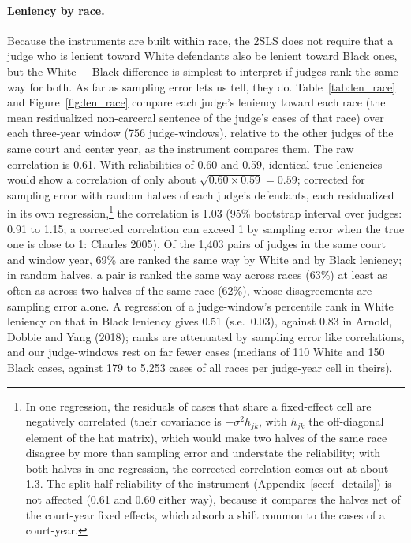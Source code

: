 \documentclass[11pt]{article}
\begin{document}
\paragraph{Leniency by race.} Because the instruments are built within race, the 2SLS does not require that a judge who is lenient toward White defendants also be lenient toward Black ones, but the White $-$ Black difference is simplest to interpret if judges rank the same way for both. As far as sampling error lets us tell, they do. Table~\ref{tab:len_race} and Figure~\ref{fig:len_race} compare each judge's leniency toward each race (the mean residualized non-carceral sentence of the judge's cases of that race) over each three-year window (756 judge-windows), relative to the other judges of the same court and center year, as the instrument compares them. The raw correlation is 0.61. With reliabilities of 0.60 and 0.59, identical true leniencies would show a correlation of only about $\sqrt{0.60 \times 0.59} = 0.59$; corrected for sampling error with random halves of each judge's defendants, each residualized in its own regression,\footnote{In one regression, the residuals of cases that share a fixed-effect cell are negatively correlated (their covariance is $-\sigma^2 h_{jk}$, with $h_{jk}$ the off-diagonal element of the hat matrix), which would make two halves of the same race disagree by more than sampling error and understate the reliability; with both halves in one regression, the corrected correlation comes out at about 1.3. The split-half reliability of the instrument (Appendix~\ref{sec:f_details}) is not affected (0.61 and 0.60 either way), because it compares the halves net of the court-year fixed effects, which absorb a shift common to the cases of a court-year.} the correlation is 1.03 (95\% bootstrap interval over judges: 0.91 to 1.15; a corrected correlation can exceed 1 by sampling error when the true one is close to 1: Charles 2005). Of the 1,403 pairs of judges in the same court and window year, 69\% are ranked the same way by White and by Black leniency; in random halves, a pair is ranked the same way across races (63\%) at least as often as across two halves of the same race (62\%), whose disagreements are sampling error alone. A regression of a judge-window's percentile rank in White leniency on that in Black leniency gives 0.51 (s.e.\ 0.03), against 0.83 in Arnold, Dobbie and Yang (2018); ranks are attenuated by sampling error like correlations, and our judge-windows rest on far fewer cases (medians of 110 White and 150 Black cases, against 179 to 5,253 cases of all races per judge-year cell in theirs).
\end{document}
